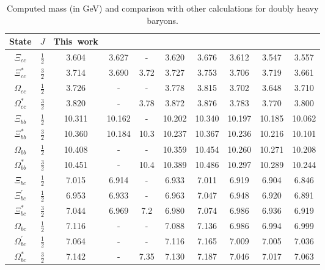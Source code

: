 \documentclass[12pt,prd,onecolumn,floatfix,nofootinbib]{revtex4}
\begin{document}
\renewcommand{\tabcolsep}{0.34cm} \renewcommand{\arraystretch}{1.1}
\begin{table}[!hbt]
\caption{Computed mass (in GeV) and comparison with other calculations for
doubly heavy baryons. }
\label{tab:comparisonB}%
\begin{tabular}{cccccccccc}
\hline\hline
\textrm{State} & $J$ & \textrm{This\ work} & \cite{KR:2014gca} & \cite%
{Aliev:2012iv} & \cite{Ebert:2004ck} & \cite{Roberts:2007ni} & \cite{Albertus:2006ya} & 
\cite{Giannuzzi:2009gh} & \cite{Bernotas:2008fv} \\ \hline
$\Xi_{cc}$ & $\frac{1}{2}$ & 3.604 & 3.627 & - & 3.620 & 3.676 & 3.612 & 3.547 &
3.557 \\
$\Xi_{cc}^{\ast}$ & $\frac{3}{2}$ & 3.714 & 3.690 & 3.72 & 3.727 & 3.753 & 3.706 &
3.719 & 3.661 \\
$\Omega_{cc}$ & $\frac{1}{2}$ & 3.726 & - & - & 3.778 & 3.815 & 3.702 & 3.648 &
3.710 \\
$\Omega_{cc}^{\ast}$ & $\frac{3}{2}$ & 3.820 & - & 3.78 & 3.872 & 3.876 & 3.783 &
3.770 & 3.800 \\
$\Xi_{bb}$ & $\frac{1}{2}$ & 10.311 & 10.162 & - & 10.202 & 10.340 & 10.197 &
10.185 & 10.062 \\
$\Xi_{bb}^{\ast}$ & $\frac{3}{2}$ & 10.360 & 10.184 & 10.3 & 10.237 & 10.367 &
10.236 & 10.216 & 10.101 \\
$\Omega_{bb}$ & $\frac{1}{2}$ & 10.408 & - & - & 10.359 & 10.454 & 10.260 &
10.271 & 10.208 \\
$\Omega_{bb}^{\ast}$ & $\frac{3}{2}$ & 10.451 & - & 10.4 & 10.389 & 10.486 & 10.297
& 10.289 & 10.244 \\
$\Xi_{bc}$ & $\frac{1}{2}$ & 7.015 & 6.914 & - & 6.933 & 7.011 & 6.919 & 6.904 &
6.846 \\
$\Xi_{bc}^{\prime}$ & $\frac{1}{2}$ & 6.953 & 6.933 & - & 6.963 & 7.047 & 6.948
& 6.920 & 6.891 \\
$\Xi_{bc}^{\ast}$ & $\frac{3}{2}$ & 7.044 & 6.969 & 7.2 & 6.980 & 7.074 & 6.986 &
6.936 & 6.919 \\
$\Omega_{bc}$ & $\frac{1}{2}$ & 7.116 & - & - & 7.088 & 7.136 & 6.986 & 6.994 &
6.999 \\
$\Omega_{bc}^{\prime}$ & $\frac{1}{2}$ & 7.064 & - & - & 7.116 & 7.165 & 7.009 &
7.005 & 7.036 \\
$\Omega_{bc}^{\ast}$ & $\frac{3}{2}$ & 7.142 & - & 7.35 & 7.130 & 7.187 & 7.046 &
7.017 & 7.063 \\ \hline\hline
\end{tabular}%
\end{table}
\end{document}
